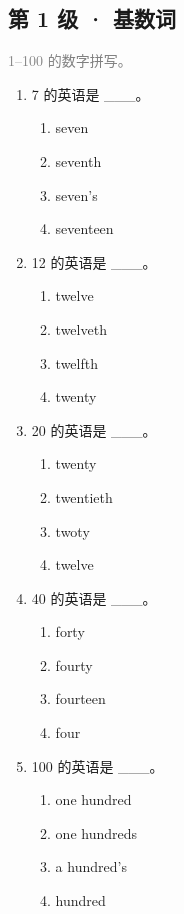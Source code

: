 \documentclass[11pt,a4paper]{ctexart}
\begin{document}
\subsection*{第 1 级 · 基数词}
\noindent\textcolor{gray}{1–100 的数字拼写。}\par\smallskip
\begin{enumerate}[leftmargin=*,itemsep=4pt]
\item 7 的英语是 \_\_\_。
\begin{enumerate}[label=\Alph*.,leftmargin=2em,itemsep=1pt,topsep=2pt]
\item seven
\item seventh
\item seven’s
\item seventeen
\end{enumerate}
\item 12 的英语是 \_\_\_。
\begin{enumerate}[label=\Alph*.,leftmargin=2em,itemsep=1pt,topsep=2pt]
\item twelve
\item twelveth
\item twelfth
\item twenty
\end{enumerate}
\item 20 的英语是 \_\_\_。
\begin{enumerate}[label=\Alph*.,leftmargin=2em,itemsep=1pt,topsep=2pt]
\item twenty
\item twentieth
\item twoty
\item twelve
\end{enumerate}
\item 40 的英语是 \_\_\_。
\begin{enumerate}[label=\Alph*.,leftmargin=2em,itemsep=1pt,topsep=2pt]
\item forty
\item fourty
\item fourteen
\item four
\end{enumerate}
\item 100 的英语是 \_\_\_。
\begin{enumerate}[label=\Alph*.,leftmargin=2em,itemsep=1pt,topsep=2pt]
\item one hundred
\item one hundreds
\item a hundred’s
\item hundred
\end{enumerate}

\end{enumerate}
\end{document}
